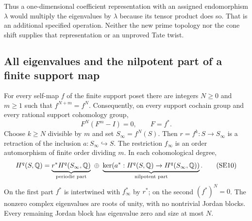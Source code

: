 Thus a one-dimensional coefficient representation with an assigned
endomorphism $\lambda$ would multiply the eigenvalues by $\lambda$
because its tensor product does so. That is an additional specified
operation. Neither the new prime topology nor the cone shift supplies
that representation or an unproved Tate twist.

\subsection{All eigenvalues and the nilpotent part of a finite support map}

\begin{theorem}
\label{thm:eventual-periodicity}
For every self-map $f$ of the finite support poset there are integers
$N\ge0$ and $m\ge1$ such that $f^{N+m}=f^N$. Consequently, on every
support cochain group and every rational support cohomology group,
\[
 F^N(F^m-I)=0,\qquad F=f^*.
 \tag{SE9}\label{eq:annihilating-polynomial}
\]
Choose $k\ge N$ divisible by $m$ and set $S_\infty=f^N(S)$.
Then $r=f^k:S\to S_\infty$ is a retraction of the inclusion
$a:S_\infty\hookrightarrow S$. The restriction $f_\infty$ is an
order automorphism of finite order dividing $m$. In each cohomological
degree,
\[
 H^q(S,\mathbb Q)=
 \underbrace{r^*H^q(S_\infty,\mathbb Q)}_{\text{periodic part}}
 \ \oplus\
 \underbrace{\ker(a^*:H^q(S,\mathbb Q)\to H^q(S_\infty,\mathbb Q))}_{\text{nilpotent part}}.
 \tag{SE10}\label{eq:periodic-decomposition}
\]
On the first part $f^*$ is intertwined with $f_\infty^*$ by $r^*$;
on the second $(f^*)^N=0$. The nonzero complex eigenvalues are roots
of unity, with no nontrivial Jordan blocks. Every remaining Jordan
block has eigenvalue zero and size at most $N$.
\end{theorem}
